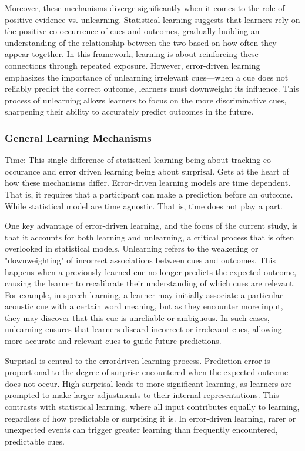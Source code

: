 Moreover, these mechanisms diverge significantly when it comes to the role of positive evidence vs. unlearning. Statistical learning suggests that learners rely on the positive co-occurrence of cues and outcomes, gradually building an understanding of the relationship between the two based on how often they appear together. In this framework, learning is about reinforcing these connections through repeated exposure. However, error-driven learning emphasizes the importance of unlearning irrelevant cues—when a cue does not reliably predict the correct outcome, learners must downweight its influence. This process of unlearning allows learners to focus on the more discriminative cues, sharpening their ability to accurately predict outcomes in the future.

\subsubsection{General Learning Mechanisms}
Time: This single difference of statistical learning being about tracking co-occurance and error driven learning being about surprisal. Gets at the heart of how these mechanisms differ. Error-driven learning models are time dependent. That is, it requires that a participant can make a prediction before an outcome. While statistical model are time agnostic. That is, time does not play a part. 

One key advantage of error-driven learning, and the focus of the current study, is that it accounts for both learning and unlearning, a critical process that is often overlooked in statistical models. Unlearning refers to the weakening or "downweighting" of incorrect associations between cues and outcomes. This happens when a previously learned cue no longer predicts the expected outcome, causing the learner to recalibrate their understanding of which cues are relevant. For example, in speech learning, a learner may initially associate a particular acoustic cue with a certain word meaning, but as they encounter more input, they may discover that this cue is unreliable or ambiguous. In such cases, unlearning ensures that learners discard incorrect or irrelevant cues, allowing more accurate and relevant cues to guide future predictions.

Surprisal is central to the error\-driven learning process. Prediction error is proportional to the degree of surprise encountered when the expected outcome does not occur. High surprisal leads to more significant learning, as learners are prompted to make larger adjustments to their internal representations. This contrasts with statistical learning, where all input contributes equally to learning, regardless of how predictable or surprising it is. In error-driven learning, rarer or unexpected events can trigger greater learning than frequently encountered, predictable cues.

